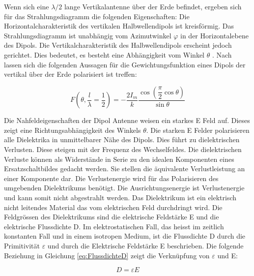 Wenn sich eine $\lambda /2$ lange Vertikalantenne über der Erde befindet,  ergeben sich für das Strahlungsdiagramm die folgenden Eigenschaften: 
Die Horizontalcharakteristik des vertikalen Halbwellendipols ist kreisförmig. Das Strahlungsdiagramm ist unabhängig vom Azimutwinkel $\varphi$ in der Horizontalebene des Dipols. Die Vertikalcharakteristik des  Halbwellendipols erscheint jedoch gerichtet. Dies bedeutet, es besteht eine Abhängigkeit vom Winkel $\theta$ \cite{zinke1965lehrbuch}. 
Nach \cite{elliott1981antenna} lassen sich die folgenden Aussagen für die Gewichtungsfunktion  eines Dipols der vertikal über der Erde polarisiert ist treffen\cite{elliott1981antenna}:

\begin{equation}\label{eq:FDipolTheat}
F(\theta,\frac{l}{\lambda}=\dfrac{1}{2})=-\dfrac{2I_{m}}{k}\dfrac{\cos\left(\dfrac{\pi}{2}\cos\theta\right)}{\sin\theta}
\end{equation}


Die Nahfeldeigenschaften der Dipol Antenne weisen ein starkes E Feld auf. Dieses zeigt eine Richtungsabhängigkeit  des Winkels $\theta$. Die starken E Felder polarisieren alle Dielektrika in unmittelbarer Nähe des Dipols. Dies führt zu dielektrischen Verlusten. Diese steigen mit der Frequenz des Wechselfeldes. Die dielektrischen Verluste können als Widerstände in Serie zu den idealen Komponenten eines Ersatzschaltbildes gedacht werden. Sie stellen die äquivalente Verlustleistung an einer Komponente dar. Die Verlustenergie wird für das Polarisieren des umgebenden Dielektrikums 
benötigt. Die Ausrichtungsenergie ist Verlustenergie und kann somit nicht abgestrahlt werden.
Das Dielektrikum ist ein elektrisch nicht leitendes Material das vom elektrischen Feld durchdringt wird. Die Feldgrössen des Dielektrikums sind die elektrische Feldstärke E und die elektrische Flussdichte D. Im elektrostatischen Fall, das heisst im zeitlich konstanten Fall und in einem isotropen Medium, ist die Flussdichte D durch die Primitivität $\varepsilon $ und durch die Elektrische Feldstärke E beschrieben. Die folgende Beziehung in Gleichung \ref{eq:FlussdichteD} zeigt die Verknüpfung von $\varepsilon $  und E:

\begin{equation}\label{eq:FlussdichteD}
D=\varepsilon E
\end{equation}

